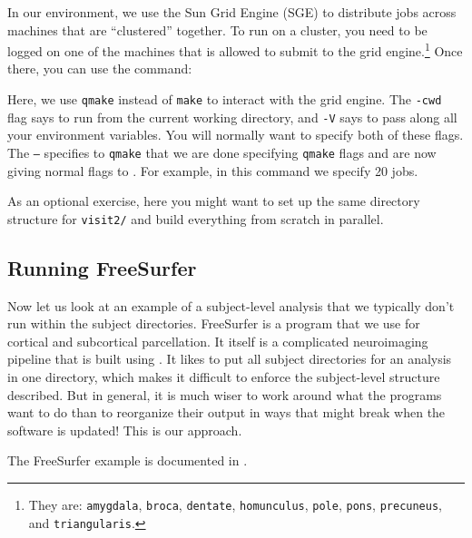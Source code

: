 In our environment, we use the Sun Grid Engine (SGE) to distribute jobs across machines that are ``clustered'' together. To run on a cluster, you need to be logged on one of the machines that is allowed to submit to the grid engine.\footnote{They are: \texttt{amygdala}, \texttt{broca}, \texttt{dentate}, \texttt{homunculus}, \texttt{pole}, \texttt{pons}, \texttt{precuneus}, and \texttt{triangularis}.} Once there, you can use the command:

Here, we use \texttt{qmake} instead of \texttt{make} to interact with the grid engine. The \texttt{-cwd} flag says to run from the current working directory, and \texttt{-V} says to pass along all your environment variables. You will normally want to specify both of these flags. The \texttt{--} specifies to \texttt{qmake} that we are done specifying \texttt{qmake} flags and are now giving normal flags to \maken{}. For example, in this command we specify 20 jobs. 

As an optional exercise, here you might want to set up the same directory structure for \texttt{visit2/} and build everything from scratch in parallel.

\subsection{Running FreeSurfer}
Now let us look at an example of a subject-level analysis that we typically don't run within the subject directories. FreeSurfer \citep[see][]{Desikan2006968, Fischl01012004, Fischl2004S69} is a program that we use for cortical and subcortical parcellation. It itself is a complicated neuroimaging pipeline that is built using \maken{}. It likes to put all subject directories for an analysis in one directory, which makes it difficult to enforce the subject-level structure described. But in general, it is much wiser to work around what the programs want to do than to reorganize their output in ways that might break when the software is updated! This is our approach.

The FreeSurfer example is documented in . 

